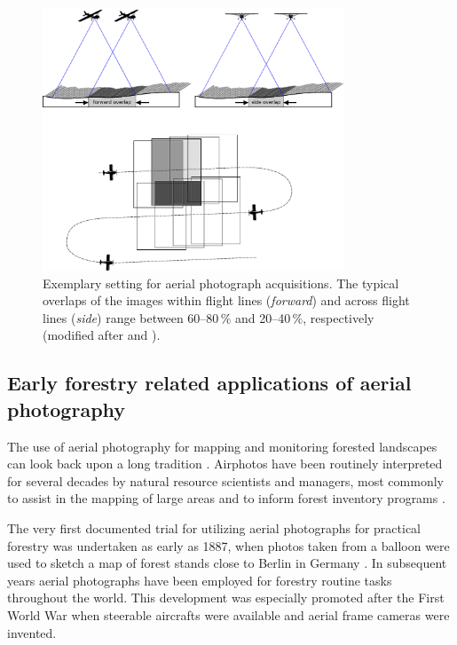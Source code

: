 \begin{figure}[!tb]
	\centering
	\includegraphics[width=0.8\textwidth]{Figures/vertAirPhoto/vertAirPhoto_v2} %
	\caption[Exemplary setting for aerial photograph acquisitions.]{Exemplary setting for aerial photograph acquisitions. 
		The typical overlaps of the images within flight lines (\emph{forward}) and across flight lines (\emph{side})
		range between 60--80\,$\%$ and 20--40\,$\%$, 
		respectively (modified after \cite{vanLaar.2007} and \cite{AFL.2012}).}
	\label{fig:vertAirPhoto}
\end{figure}

\subsection{Early forestry related applications of aerial photography}

The use of aerial photography for mapping and monitoring forested landscapes can look back upon a long tradition \parencite{Hildebrandt.1996}.
Airphotos have been routinely interpreted for several decades by natural resource scientists and managers, 
most commonly to assist in the mapping of large areas and to inform forest inventory programs \parencite{Cohen.1996, vanLaar.2007, AFL.2012} . 

The very first documented trial for utilizing aerial photographs for practical forestry was undertaken as early as 1887, 
when photos taken from a balloon were used to sketch a map of forest stands close to Berlin in Germany \parencite{Hildebrandt.2010}. 
In subsequent years aerial photographs have been employed for forestry routine tasks throughout the world.
This development was especially promoted after the First World War when steerable aircrafts were available 
and aerial frame cameras were invented.

